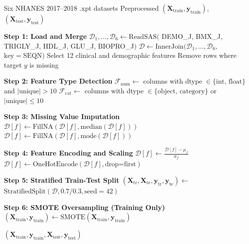 \documentclass[conference,10pt]{IEEEtran}
\begin{document}
\begin{algorithm}[!t]
\caption{Dataset Preprocessing and Splitting}
\label{alg:preprocessing}
\small
\begin{algorithmic}[1]
\REQUIRE Six NHANES 2017--2018 .xpt datasets
\ENSURE Preprocessed $(\mathbf{X}_{\text{train}}, \mathbf{y}_{\text{train}})$, $(\mathbf{X}_{\text{test}}, \mathbf{y}_{\text{test}})$

\STATE \textbf{Step 1: Load and Merge}
\STATE $\mathcal{D}_1, \ldots, \mathcal{D}_6 \leftarrow \text{ReadSAS}($
\STATE \quad DEMO\_J, BMX\_J, TRIGLY\_J,
\STATE \quad HDL\_J, GLU\_J, BIOPRO\_J$)$
\STATE $\mathcal{D} \leftarrow \text{InnerJoin}(\mathcal{D}_1, \ldots, \mathcal{D}_6,$
\STATE \quad $\text{key}=\text{SEQN})$
\STATE Select 12 clinical and demographic features
\STATE Remove rows where target $y$ is missing

\STATE \textbf{Step 2: Feature Type Detection}
\STATE $\mathcal{F}_{\text{num}} \leftarrow$ columns with dtype $\in \{\text{int, float}\}$ and $|\text{unique}| > 10$
\STATE $\mathcal{F}_{\text{cat}} \leftarrow$ columns with dtype $\in \{\text{object, category}\}$ or $|\text{unique}| \leq 10$

\STATE \textbf{Step 3: Missing Value Imputation}
    \STATE $\mathcal{D}[f] \leftarrow \text{FillNA}(\mathcal{D}[f], \text{median}(\mathcal{D}[f]))$
\ENDFOR
{}
    \STATE $\mathcal{D}[f] \leftarrow \text{FillNA}(\mathcal{D}[f], \text{mode}(\mathcal{D}[f]))$
\ENDFOR

\STATE \textbf{Step 4: Feature Encoding and Scaling}
    \STATE $\mathcal{D}[f] \leftarrow \frac{\mathcal{D}[f] - \mu_f}{\sigma_f}$ 
\ENDFOR
{}
    \STATE $\mathcal{D}[f] \leftarrow \text{OneHotEncode}(\mathcal{D}[f], \text{drop=first})$
\ENDFOR

\STATE \textbf{Step 5: Stratified Train-Test Split}
\STATE $(\mathbf{X}_{\text{tr}}, \mathbf{X}_{\text{te}}, \mathbf{y}_{\text{tr}}, \mathbf{y}_{\text{te}}) \leftarrow$
\STATE \quad $\text{StratifiedSplit}(\mathcal{D}, 0.7/0.3, \text{seed}=42)$

\STATE \textbf{Step 6: SMOTE Oversampling (Training Only)}
\STATE $(\mathbf{X}_{\text{train}}, \mathbf{y}_{\text{train}}) \leftarrow \text{SMOTE}(\mathbf{X}_{\text{train}}, \mathbf{y}_{\text{train}})$

\RETURN $(\mathbf{X}_{\text{train}}, \mathbf{y}_{\text{train}}, \mathbf{X}_{\text{test}}, \mathbf{y}_{\text{test}})$
\end{algorithmic}
\end{algorithm}
\end{document}
